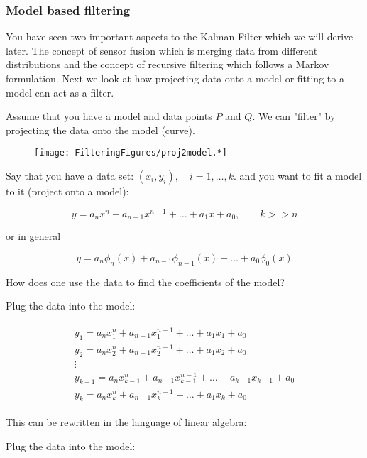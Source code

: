 \hypertarget{model-based-filtering}{%
\subsubsection{Model based filtering}\label{model-based-filtering}}

You have seen two important aspects to the Kalman Filter which we will
derive later. The concept of sensor fusion which is merging data from
different distributions and the concept of recursive filtering which
follows a Markov formulation. Next we look at how projecting data onto a
model or fitting to a model can act as a filter.

Assume that you have a model and data points \(P\) and \(Q\). We can
"filter" by projecting the data onto the model (curve).

\begin{figure}
\centering
\texttt{[image: FilteringFigures/proj2model.*]}
\caption{}
\end{figure}

Say that you have a data set: \((x_i, y_i),\quad  i=1, \dots, k.\) and
you want to fit a model to it (project onto a model):

\[y = a_n x^n + a_{n-1}x^{n-1} + \dots + a_1x + a_0 , \quad\quad  k >> n\]

or in general

\[y = a_n \phi_n(x) + a_{n-1}\phi_{n-1}(x) + \dots + a_0 \phi_0(x)\]

How does one use the data to find the coefficients of the model?

Plug the data into the model:

\[\begin{aligned}
\begin{array}{l}
y_1 = a_n x_1^n + a_{n-1}x_1^{n-1} + \dots + a_1x_1 + a_0 \\[3mm]
y_2 = a_n x_2^n + a_{n-1}x_2^{n-1} + \dots + a_1x_2 + a_0 \\[3mm]
\vdots \\[3mm]
y_{k-1} = a_n x_{k-1}^n + a_{n-1}x_{k-1}^{n-1} + \dots + a_{k-1}x_{k-1} + a_0 \\[3mm]
y_k = a_n x_k^n + a_{n-1}x_k^{n-1} + \dots + a_1x_k + a_0
\end{array}
\end{aligned}\]

This can be rewritten in the language of linear algebra:

Plug the data into the model:

